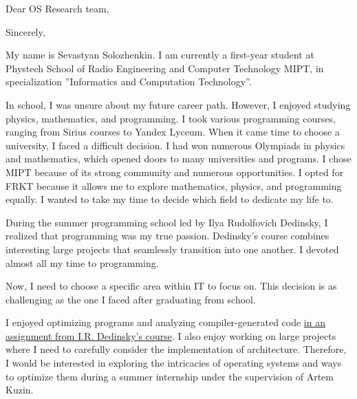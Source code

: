 \documentclass[11pt,a4paper,roman]{moderncv}
\date{}
\begin{document}
\opening{Dear OS Research team,}
\closing{Sincerely, }

\makelettertitle
\hspace{0.5cm}
My name is Sevastyan Solozhenkin. I am currently a first-year student at Phystech School of Radio Engineering and Computer Technology MIPT, in specialization ”Informatics and
Computation Technology”.

\hspace{0.5cm}
In school, I was unsure about my future career path. However, I enjoyed studying physics, mathematics, and programming. I took various programming courses, ranging from Sirius courses to Yandex Lyceum. When it came time to choose a university, I faced a difficult decision. I had won numerous Olympiads in physics and mathematics, which opened doors to many universities and programs. I chose MIPT because of its strong community and numerous opportunities. I opted for FRKT because it allows me to explore mathematics, physics, and programming equally. I wanted to take my time to decide which field to dedicate my life to.

\hspace{0.5cm}
During the summer programming school led by Ilya Rudolfovich Dedinsky, I realized that programming was my true passion. Dedinsky’s course combines interesting large projects that seamlessly transition into one another. I devoted almost all my time to programming.

\hspace{0.5cm}
Now, I need to choose a specific area within IT to focus on. This decision is as challenging as the one I faced after graduating from school.

\hspace{0.5cm}
I enjoyed optimizing programs and analyzing compiler-generated code \href{https://github.com/sevaphasol/mandelbrot}{in an assignment from I.R. Dedinsky's course}. I also enjoy working on large projects where I need to carefully consider the implementation of architecture. Therefore, I would be interested in exploring the intricacies of operating systems and ways to optimize them during a summer internship under the supervision of Artem Kuzin.

\makeletterclosing
\end{document}
